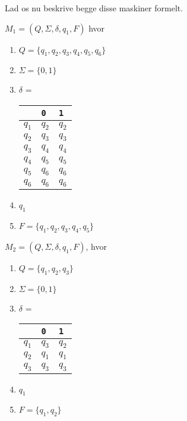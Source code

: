 Lad os nu beskrive begge disse maskiner formelt.

$M_{1} = (Q, \Sigma, \delta, q_{1}, F)$ hvor
\begin{enumerate}
	\item $Q = \{q_{1}, q_{2}, q_{3}, q_{4}, q_{5}, q_{6}\}$
	\item $\Sigma = \{0,1\}$
	\item $\delta$ =
	      \begin{table}[h]
		      \centering
		      \begin{tabular}{l|ll}
			            & \texttt{0} & \texttt{1} \\ \hline
			      $q_1$ & $q_2$      & $q_2$      \\
			      $q_2$ & $q_3$      & $q_3$      \\
			      $q_3$ & $q_4$      & $q_4$      \\
			      $q_4$ & $q_5$      & $q_5$      \\
			      $q_5$ & $q_6$      & $q_6$      \\
			      $q_6$ & $q_6$      & $q_6$
		      \end{tabular}
	      \end{table}
	\item $q_{1}$
	\item $F = \{q_{1}, q_{2}, q_{3}, q_{4}, q_{5}\}$
\end{enumerate}

$M_{2} = (Q, \Sigma, \delta, q_{1}, F)$, hvor
\begin{enumerate}
	\item $Q = \{q_{1}, q_{2}, q_{3}\}$
	\item $\Sigma = \{0,1\}$
	\item $\delta$ =

	      \begin{table}[h]
		      \centering
		      \begin{tabular}{l|ll}
			            & \texttt{0} & \texttt{1} \\ \hline
			      $q_1$ & $q_3$      & $q_2$      \\
			      $q_2$ & $q_1$      & $q_1$      \\
			      $q_3$ & $q_3$      & $q_3$      \\
		      \end{tabular}
	      \end{table}

	\item $q_{1}$
	\item $F = \{q_{1}, q_{2}\}$
\end{enumerate}

